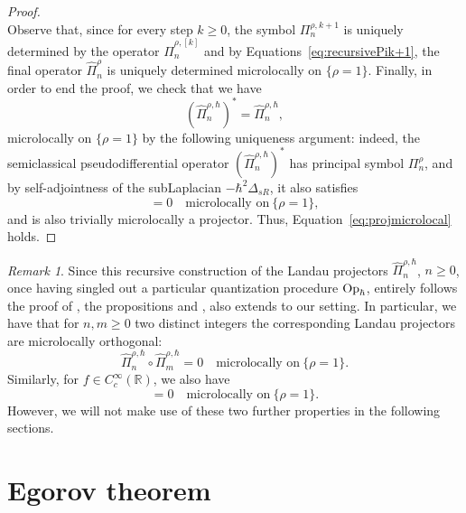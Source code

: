 \documentclass[12pt,a4paper]{amsart}
\theoremstyle{plain}
\theoremstyle{definition}
\theoremstyle{remark}
\newtheorem{remark}[theorem]{Remark}
\numberwithin{equation}{section}
\theoremstyle{definition}
\def\R{{\mathbb R}}%
\def \Op{{\rm Op}}
\numberwithin{equation}{section}
\begin{document}
\begin{proof}
\begin{equation*}
    \end{equation*}
    Observe that, since for every step $k\geq 0$, the symbol $\Pi_n^{\rho,k+1}$ is uniquely determined by the operator $\hat{\Pi}_n^{\rho,[k]}$ and by Equations~\eqref{eq:recursivePik+1}, the final operator $\hat{\Pi}_n^\rho$ is uniquely determined microlocally on $\{\rho=1\}$.
    Finally, in order to end the proof, we check that we have
    \begin{equation}
        \label{eq:projmicrolocal}
        (\hat{\Pi}_n^{\rho,\hbar})^* = \hat{\Pi}_n^{\rho,\hbar},
    \end{equation}
    microlocally on $\{\rho=1\}$ by the following uniqueness argument: indeed, the semiclassical pseudodifferential operator $(\hat{\Pi}_n^{\rho,\hbar})^*$ has principal symbol $\Pi_n^\rho$, and by self-adjointness of the subLaplacian $-\hbar^2\Delta_{sR}$, it also satisfies
    \begin{equation*}
        [-\hbar^2 \Delta_{sR},(\hat{\Pi}_n^{\rho,\hbar})^*] = 0 \quad\mbox{microlocally on}\ \{\rho=1\},
    \end{equation*}
    and is also trivially microlocally a projector. Thus, Equation~\eqref{eq:projmicrolocal} holds.
\end{proof}

\begin{remark}
    Since this recursive construction of the Landau projectors $\hat{\Pi}_n^{\rho,\hbar}$, $n\geq 0$, once having singled out a particular quantization procedure $\Op_\hbar$, entirely follows the proof of \cite[Theorem 1.2]{BFKRV}, the propositions \cite[Proposition 1.3]{BFKRV} and \cite[Proposition 2.5]{BFKRV}, also extends to our setting. In particular, we have that for $n,m \geq 0$ two distinct integers the corresponding Landau projectors are microlocally orthogonal:
    \begin{equation*}
        \hat{\Pi}_n^{\rho,\hbar}\circ \hat{\Pi}_m^{\rho,\hbar} = 0\quad\mbox{microlocally on}\ \{\rho = 1\}.
    \end{equation*}
    Similarly, for $f\in C_c^\infty(\R)$, we also have
    \begin{equation*}
         [f(-\hbar^2\Delta_{sR}),\hat{\Pi}_n^{\rho,\hbar}] = 0\quad\mbox{microlocally on}\ \{\rho=1\}.
     \end{equation*}
     However, we will not make use of these two further properties in the following sections.
\end{remark}



\section{Egorov theorem}
\label{sect:egorov}
\end{document}
